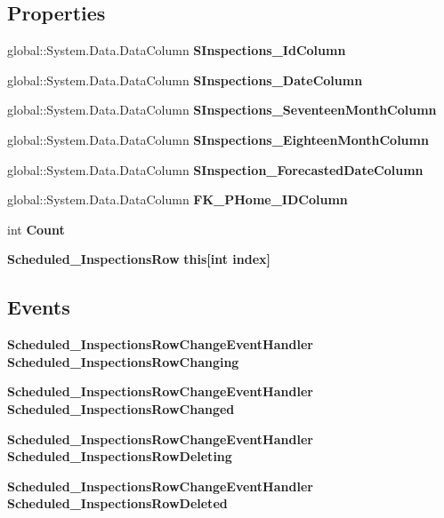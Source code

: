 \subsection*{Properties}
\begin{DoxyCompactItemize}
\item 
global\+::\+System.\+Data.\+Data\+Column \textbf{ S\+Inspections\+\_\+\+Id\+Column}\hspace{0.3cm}{\ttfamily  [get]}
\item 
global\+::\+System.\+Data.\+Data\+Column \textbf{ S\+Inspections\+\_\+\+Date\+Column}\hspace{0.3cm}{\ttfamily  [get]}
\item 
global\+::\+System.\+Data.\+Data\+Column \textbf{ S\+Inspections\+\_\+\+Seventeen\+Month\+Column}\hspace{0.3cm}{\ttfamily  [get]}
\item 
global\+::\+System.\+Data.\+Data\+Column \textbf{ S\+Inspections\+\_\+\+Eighteen\+Month\+Column}\hspace{0.3cm}{\ttfamily  [get]}
\item 
global\+::\+System.\+Data.\+Data\+Column \textbf{ S\+Inspection\+\_\+\+Forecasted\+Date\+Column}\hspace{0.3cm}{\ttfamily  [get]}
\item 
global\+::\+System.\+Data.\+Data\+Column \textbf{ F\+K\+\_\+\+P\+Home\+\_\+\+I\+D\+Column}\hspace{0.3cm}{\ttfamily  [get]}
\item 
int \textbf{ Count}\hspace{0.3cm}{\ttfamily  [get]}
\item 
\textbf{ Scheduled\+\_\+\+Inspections\+Row} \textbf{ this[int index]}\hspace{0.3cm}{\ttfamily  [get]}
\end{DoxyCompactItemize}
\subsection*{Events}
\begin{DoxyCompactItemize}
\item 
\textbf{ Scheduled\+\_\+\+Inspections\+Row\+Change\+Event\+Handler} \textbf{ Scheduled\+\_\+\+Inspections\+Row\+Changing}
\item 
\textbf{ Scheduled\+\_\+\+Inspections\+Row\+Change\+Event\+Handler} \textbf{ Scheduled\+\_\+\+Inspections\+Row\+Changed}
\item 
\textbf{ Scheduled\+\_\+\+Inspections\+Row\+Change\+Event\+Handler} \textbf{ Scheduled\+\_\+\+Inspections\+Row\+Deleting}
\item 
\textbf{ Scheduled\+\_\+\+Inspections\+Row\+Change\+Event\+Handler} \textbf{ Scheduled\+\_\+\+Inspections\+Row\+Deleted}
\end{DoxyCompactItemize}


